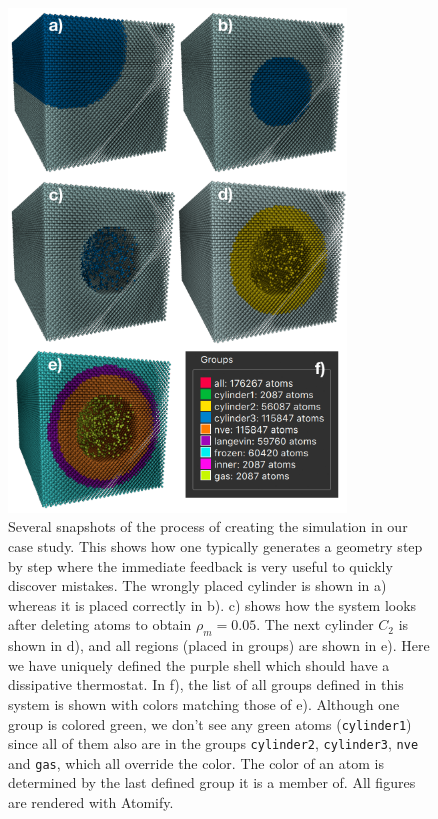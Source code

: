 \documentclass[12pt,a4paper,final]{iopart}
\newcommand{\code}[1]{\colorbox{light-gray}{\color{RawSienna}\texttt{#1}}}
\begin{document}
\begin{figure}
	\centering
	\includegraphics[width=0.8\textwidth]{figures/initial_configuration.pdf}
	\caption{
		Several snapshots of the process of creating the simulation in our case study.
		This shows how one typically generates a geometry step by step where the immediate
		feedback is very useful to quickly discover mistakes.
		The wrongly placed cylinder is shown in a) whereas it is placed correctly in b).
		c) shows how the system looks after deleting atoms to obtain $\rho_m = 0.05$. The next cylinder $C_2$ is shown in d),
		and all regions (placed in groups) are shown in e). Here we have uniquely defined the purple shell which should have a dissipative thermostat.
		In f), the list of all groups defined in this system is shown with colors matching those of e).
		Although one group is colored green, we don't see any green atoms (\code{cylinder1})
		since all of them also are in the groups \code{cylinder2}, \code{cylinder3}, \code{nve} and \code{gas},
		which all override the color. The color of an atom is determined by the last defined group it is a member of.
		All figures are rendered with Atomify.
	}
	\label{fig:initial_configuration}
\end{figure}
\end{document}
